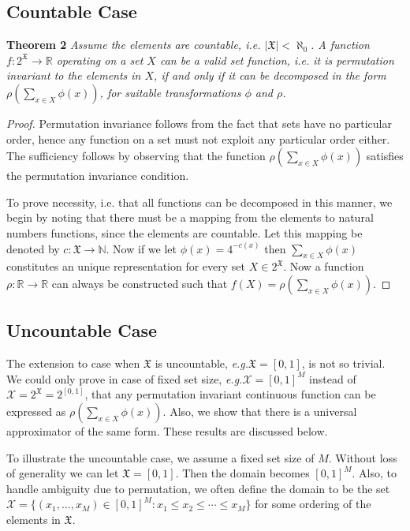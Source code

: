 \documentclass{article}
\newcommand{\latinphrase}[1]{\emph{#1}}    %
\newcommand{\eg}{\latinphrase{e.g.}\xspace}
\begin{document}
\subsection{Countable Case}
\textbf{Theorem 2} {\em 
\; Assume the elements are countable, i.e. $|\mathfrak{X}| < \aleph_0$. A function $f:2^\mathfrak{X}\to\mathbb{R}$ operating on a set $X$ can be a valid set function, i.e. it is permutation invariant to the elements in $X$, if and only if it can be decomposed in the form $\rho \left( \sum_{x\in X} \phi(x) \right)$, for suitable transformations $\phi$ and $\rho$.
}
\begin{proof}
  Permutation invariance follows from the fact that sets have no particular order, hence any function on a set must not exploit any particular order either. The sufficiency follows by observing that the function $\rho\left( \sum_{x \in X} \phi(x)\right)$ satisfies the permutation invariance condition. 

To prove necessity, i.e. that all functions can be decomposed in this manner, we begin by noting that there must be a mapping from the elements to natural numbers functions, since the elements are countable. Let this mapping be denoted by $c:\mathfrak{X}\to\mathbb{N}$. Now if we let $\phi(x)=4^{-c(x)}$ then $\sum_{x\in X} \phi(x)$ constitutes an unique representation for every set $X\in 2^\mathfrak{X}$. Now a function $\rho:\mathbb{R}\to\mathbb{R}$ can always be constructed such that $f(X) = \rho\left( \sum_{x \in X} \phi(x)\right)$.
\end{proof}



\subsection{Uncountable Case}
The extension to case when $\mathfrak{X}$ is uncountable, \eg $\mathfrak{X}=[0,1]$, is not so trivial. We could only prove in case of fixed set size, \eg $\mathcal{X}=[0,1]^M$ instead of $\mathcal{X}=2^\mathfrak{X}=2^{[0,1]}$,  that any permutation invariant continuous function can be expressed as $\rho \left( \sum_{x\in X} \phi(x) \right)$. Also, we show that there is a universal approximator of the same form. These results are discussed below.

To illustrate the uncountable case, we assume a fixed set size of $M$. 
Without loss of generality we can let $\mathfrak{X}=[0,1]$.
Then the domain becomes $[0,1]^M$. Also, to handle ambiguity due to permutation, we often define the domain to be the set $\mathcal{X}=\{ (x_1,...,x_M) \in [0,1]^M : x_1 \leq x_2 \leq \cdots \leq x_M \}$ for some ordering of the elements in $\mathfrak{X}$.
\end{document}
